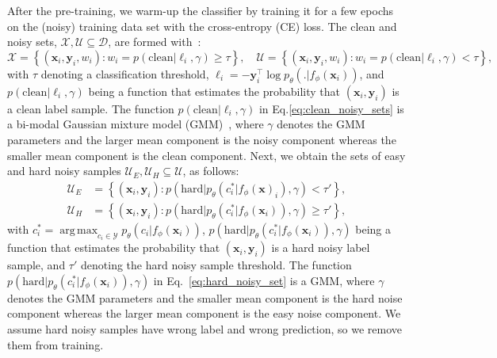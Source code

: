 \documentclass{bmvc2k}
\DeclareMathOperator*{\argmax}{arg\,max}
\begin{document}
After the pre-training,  we warm-up the classifier by training it for a few epochs on the (noisy) training data set with the cross-entropy (CE) loss. The clean and noisy sets, $\mathcal{X},\mathcal{U} \subseteq \mathcal{D}$, are formed with~\citep{arazo2019unsupervised, DivideMix,rog, jiang2020beyond}:
\begin{equation}
\mathcal{X}  = \left \{ (\mathbf{x}_i,\mathbf{y}_i, w_i) : w_i=p \left ( \text{clean} | \ell_i , \gamma \right ) \ge \tau \right \}, \quad
    \mathcal{U}  = \left \{ (\mathbf{x}_i,\mathbf{y}_i, w_i) : w_i=
p \left ( \text{clean} | \ell_i , \gamma \right ) < \tau \right \},
\label{eq:clean_noisy_sets}
\end{equation}
with $\tau$ denoting a classification threshold,
$\ell_i = -\mathbf{y}_i^{\top}\log p_{\theta}(.|f_{\phi}(\mathbf{x}_i))$, and $p \left ( \text{clean} | \ell_i , \gamma \right )$ being a function that estimates the probability that $(\mathbf{x}_i,\mathbf{y}_i)$ is a clean label sample.  The function $p \left ( \text{clean} | \ell_i , \gamma \right )$ in Eq.\ref{eq:clean_noisy_sets} is a bi-modal Gaussian mixture model (GMM)~\citep{DivideMix}, where $\gamma$ denotes the GMM parameters and the larger mean component is the noisy component whereas the smaller mean component is the clean component. Next, we obtain the sets of easy and hard noisy samples $\mathcal{U}_{E},\mathcal{U}_H \subseteq \mathcal{U}$, as follows: 
\begin{equation}
\begin{split}
    \mathcal{U}_{E}  &= \left \{ (\mathbf{x}_i,\mathbf{y}_i) : p \left ( \text{hard} |  p_{\theta}(c_i^{*}|f_{\phi}(\mathbf{x})_i),  \gamma \right ) < \tau' \right \}, \\
    \mathcal{U}_{H}  &= \left \{ (\mathbf{x}_i,\mathbf{y}_i) : 
p \left ( \text{hard} | p_{\theta}(c_i^{*}|f_{\phi}(\mathbf{x}_i)) , \gamma \right ) \ge \tau' \right \},
\end{split}
\label{eq:hard_noisy_set}
\end{equation}
with $c_i^{*}=\argmax_{c_i \in \mathcal{Y}} p_{\theta}(c_i|f_{\phi}(\mathbf{x}_i ))$, $p \left ( \text{hard} | p_{\theta}(c_i^{*}|f_{\phi}(\mathbf{x}_i)) , \gamma \right )$ being a function that estimates the probability that $(\mathbf{x}_i,\mathbf{y}_i)$ is a hard noisy label sample, and $\tau'$ denoting the hard noisy sample threshold.  The function $p \left ( \text{hard} |  p_{\theta}(c_i^{*}|f_{\phi}(\mathbf{x}_i)),\gamma \right)$ in Eq.~\ref{eq:hard_noisy_set} is a GMM, where $\gamma$ denotes the GMM parameters and the smaller mean component is the hard noise component whereas the larger mean component is the easy noise component. We assume hard noisy samples have wrong label and wrong prediction, so we remove them from training. 
\end{document}
